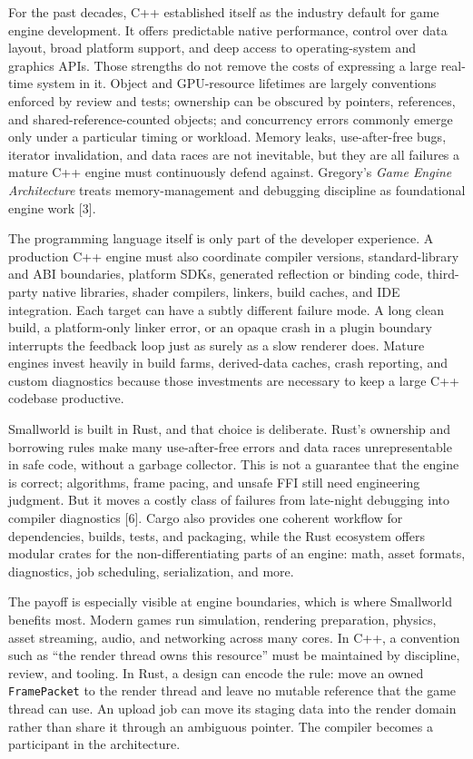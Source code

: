 \documentclass[
  11pt,
  letterpaper,
  DIV=11,
  numbers=noendperiod,
  twoside,
  open=right]{scrreprt}
\begin{document}
For the past decades, C++ established itself as the industry default for
game engine development. It offers predictable native performance,
control over data layout, broad platform support, and deep access to
operating-system and graphics APIs. Those strengths do not remove the
costs of expressing a large real-time system in it. Object and
GPU-resource lifetimes are largely conventions enforced by review and
tests; ownership can be obscured by pointers, references, and
shared-reference-counted objects; and concurrency errors commonly emerge
only under a particular timing or workload. Memory leaks, use-after-free
bugs, iterator invalidation, and data races are not inevitable, but they
are all failures a mature C++ engine must continuously defend against.
Gregory's \emph{Game Engine Architecture} treats memory-management and
debugging discipline as foundational engine work {[}3{]}.

The programming language itself is only part of the developer
experience. A production C++ engine must also coordinate compiler
versions, standard-library and ABI boundaries, platform SDKs, generated
reflection or binding code, third-party native libraries, shader
compilers, linkers, build caches, and IDE integration. Each target can
have a subtly different failure mode. A long clean build, a
platform-only linker error, or an opaque crash in a plugin boundary
interrupts the feedback loop just as surely as a slow renderer does.
Mature engines invest heavily in build farms, derived-data caches, crash
reporting, and custom diagnostics because those investments are
necessary to keep a large C++ codebase productive.

Smallworld is built in Rust, and that choice is deliberate. Rust's
ownership and borrowing rules make many use-after-free errors and data
races unrepresentable in safe code, without a garbage collector. This is
not a guarantee that the engine is correct; algorithms, frame pacing,
and unsafe FFI still need engineering judgment. But it moves a costly
class of failures from late-night debugging into compiler diagnostics
{[}6{]}. Cargo also provides one coherent workflow for dependencies,
builds, tests, and packaging, while the Rust ecosystem offers modular
crates for the non-differentiating parts of an engine: math, asset
formats, diagnostics, job scheduling, serialization, and more.

The payoff is especially visible at engine boundaries, which is where
Smallworld benefits most. Modern games run simulation, rendering
preparation, physics, asset streaming, audio, and networking across many
cores. In C++, a convention such as ``the render thread owns this
resource'' must be maintained by discipline, review, and tooling. In
Rust, a design can encode the rule: move an owned \texttt{FramePacket}
to the render thread and leave no mutable reference that the game thread
can use. An upload job can move its staging data into the render domain
rather than share it through an ambiguous pointer. The compiler becomes
a participant in the architecture.
\end{document}
